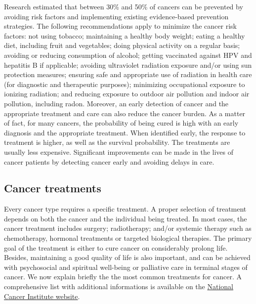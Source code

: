 Research estimated that between 30\% and 50\% of cancers can be prevented by
avoiding risk factors and implementing existing evidence-based prevention
strategies. The following recommendations apply to minimize the cancer risk
factors: not using tobacco; maintaining a healthy body weight; eating a healthy
diet, including fruit and vegetables; doing physical activity on a regular
basis; avoiding or reducing consumption of alcohol; getting vaccinated against
HPV and hepatitis B if applicable; avoiding ultraviolet radiation exposure
and/or using sun protection measures; ensuring safe and appropriate use of
radiation in health care (for diagnostic and therapeutic purposes); minimizing
occupational exposure to ionizing radiation; and reducing exposure to outdoor
air pollution and indoor air pollution, including radon. Moreover, an early
detection of cancer and the appropriate treatment and care can also reduce the
cancer burden. As a matter of fact, for many cancers, the probability of being
cured is high with an early diagnosis and the appropriate treatment. When
identified early, the response to treatment is higher, as well as the survival
probability. The treatments are usually less expensive. Significant improvements
can be made in the lives of cancer patients by detecting cancer early and
avoiding delays in care.

\subsection{Cancer treatments}

Every cancer type requires a specific treatment. A proper selection of treatment
depends on both the cancer and the individual being treated. In most cases, the
cancer treatment includes surgery; radiotherapy; and/or systemic therapy such as
chemotherapy, hormonal treatments or targeted biological therapies. The primary
goal of the treatment is either to cure cancer on considerably prolong life.
Besides, maintaining a good quality of life is also important, and can be
achieved with psychosocial and spiritual well-being or palliative care in
terminal stages of cancer. We now explain briefly the the most common treatments
for cancer. A comprehensive list with additional informations is available on
the \href{https://www.cancer.gov/about-cancer/treatment/types/surgery}{National
    Cancer Institute website}.

